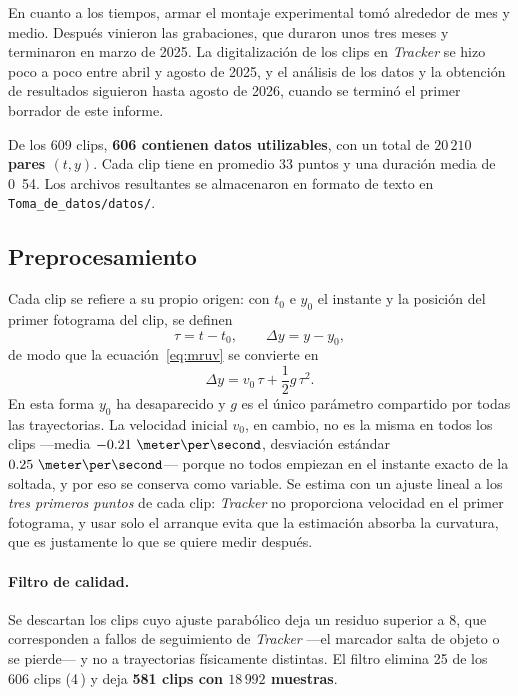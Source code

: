 \documentclass[titlepage,11pt]{article}
\providecommand{\num}[1]{\ensuremath{#1}}
\providecommand{\SI}[2]{#1\,#2}
\providecommand{\percent}{\char37\relax}
\begin{document}
En cuanto a los tiempos, armar el montaje experimental tomó alrededor de mes y
medio. Después vinieron las grabaciones, que duraron unos tres meses y
terminaron en marzo de 2025. La digitalización de los clips en \emph{Tracker}
se hizo poco a poco entre abril y agosto de 2025, y el análisis de los datos y
la obtención de resultados siguieron hasta agosto de 2026, cuando se terminó el
primer borrador de este informe.

De los 609 clips, \textbf{606 contienen datos utilizables}, con un total de
\textbf{\num{20\,210} pares $(t,y)$}. Cada clip tiene en promedio 33 puntos y una
duración media de \unit{0.54}{\second}. Los archivos resultantes se almacenaron
en formato de texto en \texttt{Toma\_de\_datos/datos/}.

\subsection{Preprocesamiento}
\label{subsec:preproceso}

Cada clip se refiere a su propio origen: con $t_0$ e $y_0$ el instante y la
posición del primer fotograma del clip, se definen
\begin{equation}
  \tau = t - t_0, \qquad \Delta y = y - y_0 ,
\end{equation}
de modo que la ecuación~\eqref{eq:mruv} se convierte en
\begin{equation}
  \Delta y = v_0\,\tau + \frac{1}{2}g\,\tau^2 .
  \label{eq:mruv_ref}
\end{equation}
En esta forma $y_0$ ha desaparecido y $g$ es el único parámetro compartido por
todas las trayectorias. La velocidad inicial $v_0$, en cambio, no es la misma
en todos los clips ---media $\num{-0.21}~\meter\per\second$, desviación
estándar $\num{0.25}~\meter\per\second$--- porque no todos empiezan en el
instante exacto de la soltada, y por eso se conserva como variable. Se estima
con un ajuste lineal a los \emph{tres primeros puntos} de cada clip:
\emph{Tracker} no proporciona velocidad en el primer fotograma, y usar solo el
arranque evita que la estimación absorba la curvatura, que es justamente lo que
se quiere medir después.

\paragraph{Filtro de calidad.} Se descartan los clips cuyo ajuste parabólico
deja un residuo superior a \unit{8}{\centi\meter}, que corresponden a fallos de
seguimiento de \emph{Tracker} ---el marcador salta de objeto o se pierde--- y
no a trayectorias físicamente distintas. El filtro elimina 25 de los 606 clips
(\SI{4}{\percent}) y deja \textbf{581 clips con \num{18\,992} muestras}.
\end{document}
